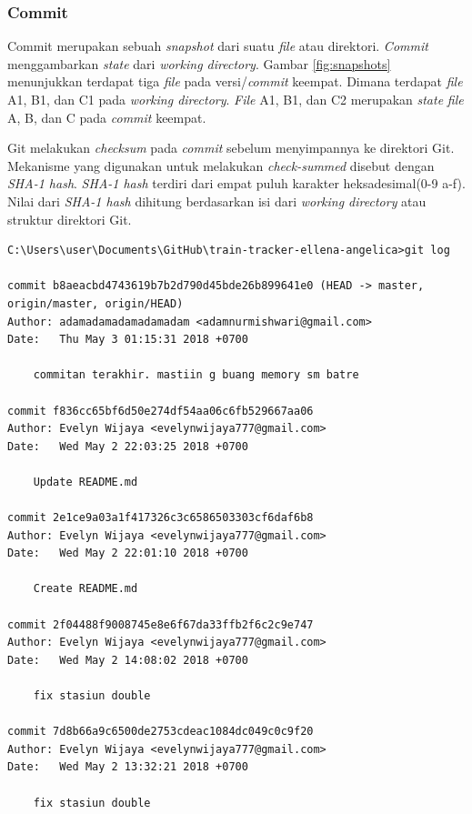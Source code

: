 \subsubsection{Commit}
Commit merupakan sebuah \textit{snapshot} dari suatu \textit{file} atau direktori. \textit{Commit} menggambarkan \textit{state} dari \textit{working directory}. Gambar \ref{fig:snapshots} menunjukkan terdapat tiga \textit{file} pada versi/\textit{commit} keempat. Dimana terdapat \textit{file} A1, B1, dan C1 pada \textit{working directory}. \textit{File} A1, B1, dan C2  merupakan \textit{state} \textit{file} A, B, dan C pada \textit{commit} keempat. 

Git melakukan \textit{checksum} pada \textit{commit} sebelum menyimpannya ke direktori Git. Mekanisme yang digunakan untuk melakukan \textit{check-summed} disebut dengan \textit{SHA-1 hash}. \textit{SHA-1 hash} terdiri dari empat puluh karakter heksadesimal(0-9 a-f). Nilai dari \textit{SHA-1 hash} dihitung berdasarkan isi dari \textit{working directory} atau struktur direktori Git.


\begin{lstlisting}[caption={Contoh histori commit dalam pengembangan perangkat lunak},label={lst:git_histori},language=plaintext]
C:\Users\user\Documents\GitHub\train-tracker-ellena-angelica>git log

commit b8aeacbd4743619b7b2d790d45bde26b899641e0 (HEAD -> master, origin/master, origin/HEAD)
Author: adamadamadamadamadam <adamnurmishwari@gmail.com>
Date:   Thu May 3 01:15:31 2018 +0700

    commitan terakhir. mastiin g buang memory sm batre

commit f836cc65bf6d50e274df54aa06c6fb529667aa06
Author: Evelyn Wijaya <evelynwijaya777@gmail.com>
Date:   Wed May 2 22:03:25 2018 +0700

    Update README.md

commit 2e1ce9a03a1f417326c3c6586503303cf6daf6b8
Author: Evelyn Wijaya <evelynwijaya777@gmail.com>
Date:   Wed May 2 22:01:10 2018 +0700

    Create README.md

commit 2f04488f9008745e8e6f67da33ffb2f6c2c9e747
Author: Evelyn Wijaya <evelynwijaya777@gmail.com>
Date:   Wed May 2 14:08:02 2018 +0700

    fix stasiun double

commit 7d8b66a9c6500de2753cdeac1084dc049c0c9f20
Author: Evelyn Wijaya <evelynwijaya777@gmail.com>
Date:   Wed May 2 13:32:21 2018 +0700

    fix stasiun double
    
\end{lstlisting}

